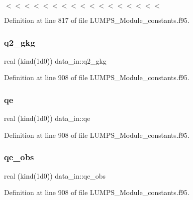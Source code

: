 $<$$<$$<$$<$$<$$<$$<$$<$$<$$<$$<$$<$$<$$<$$<$$<$$<$ 



Definition at line 817 of file L\+U\+M\+P\+S\+\_\+\+Module\+\_\+constants.\+f95.

\mbox{\label{namespacedata__in_a56c3960c55d29dadfd4d6be5ec53cc3c}} 
\subsubsection{\texorpdfstring{q2\+\_\+gkg}{q2\_gkg}}
{\footnotesize\ttfamily real (kind(1d0)) data\+\_\+in\+::q2\+\_\+gkg}



Definition at line 908 of file L\+U\+M\+P\+S\+\_\+\+Module\+\_\+constants.\+f95.

\mbox{\label{namespacedata__in_a15dff170cc3ed5a26f5b095eebf80392}} 
\subsubsection{\texorpdfstring{qe}{qe}}
{\footnotesize\ttfamily real (kind(1d0)) data\+\_\+in\+::qe}



Definition at line 908 of file L\+U\+M\+P\+S\+\_\+\+Module\+\_\+constants.\+f95.

\mbox{\label{namespacedata__in_a89bbf8e5d0059c1005799182e4f5f703}} 
\subsubsection{\texorpdfstring{qe\+\_\+obs}{qe\_obs}}
{\footnotesize\ttfamily real (kind(1d0)) data\+\_\+in\+::qe\+\_\+obs}



Definition at line 908 of file L\+U\+M\+P\+S\+\_\+\+Module\+\_\+constants.\+f95.

\mbox{\label{namespacedata__in_a13eb3e18ed56b78668ba6c47d11ba155}} 
